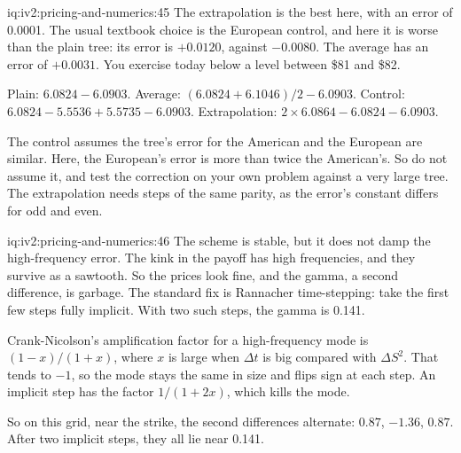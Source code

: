 \begin{solution}{iq:iv2:pricing-and-numerics:45}
The extrapolation is the best here, with an error of 0.0001. The usual textbook choice is the European control, and here it is worse than the plain tree: its error is $+0.0120$, against $-0.0080$. The average has an error of $+0.0031$. You exercise today below a level between \$81 and \$82.

Plain: $6.0824 - 6.0903$. Average: $(6.0824 + 6.1046)/2 - 6.0903$. Control: $6.0824 - 5.5536 + 5.5735 - 6.0903$. Extrapolation: $2 \times 6.0864 - 6.0824 - 6.0903$.

The control assumes the tree's error for the American and the European are similar. Here, the European's error is more than twice the American's. So do not assume it, and test the correction on your own problem against a very large tree. The extrapolation needs steps of the same parity, as the error's constant differs for odd and even.

\end{solution}

\begin{solution}{iq:iv2:pricing-and-numerics:46}
The scheme is stable, but it does not damp the high-frequency error. The kink in the payoff has high frequencies, and they survive as a sawtooth. So the prices look fine, and the gamma, a second difference, is garbage. The standard fix is Rannacher time-stepping: take the first few steps fully implicit. With two such steps, the gamma is 0.141.

Crank-Nicolson's amplification factor for a high-frequency mode is $(1 - x)/(1 + x)$, where $x$ is large when $\Delta t$ is big compared with $\Delta S^2$. That tends to $-1$, so the mode stays the same in size and flips sign at each step. An implicit step has the factor $1/(1 + 2x)$, which kills the mode.

So on this grid, near the strike, the second differences alternate: $0.87$, $-1.36$, $0.87$. After two implicit steps, they all lie near 0.141.

\end{solution}

